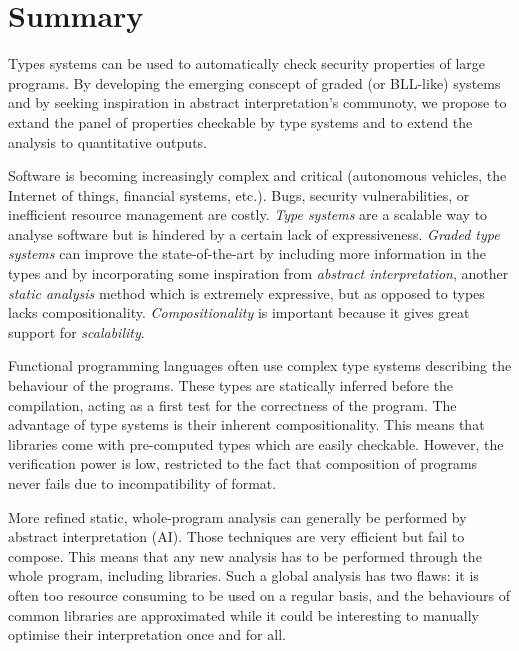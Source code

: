 \documentclass{article}[11pt]
\begin{document}
\vspace{2cm}



\newpage


\section{Summary}

Types systems can be used to automatically check security properties of large programs. By developing the emerging conscept of graded (or BLL-like) systems and by seeking inspiration in abstract interpretation's communoty, we propose to extand the panel of properties checkable by type systems and to extend the analysis to quantitative outputs.

Software is becoming increasingly complex and critical (autonomous vehicles, the Internet of things, financial systems, etc.). Bugs, security vulnerabilities, or inefficient resource management are costly. {\em Type systems} are a scalable way to analyse software but is hindered by a certain lack of expressiveness. {\em Graded type systems} can improve the state-of-the-art by including more information in the types and by incorporating some inspiration from {\em abstract interpretation}, another {\em static analysis} method which is extremely expressive, but as opposed to types lacks compositionality. {\em Compositionality} is important because it gives great support for {\em scalability}.

Functional programming languages often use complex type systems describing the behaviour of the programs. These types are statically inferred before the compilation, acting as a first test for the correctness of the program. The advantage of type systems is their inherent compositionality. This means that libraries come with pre-computed types which are easily checkable. However, the verification power is low, restricted to the fact that composition of programs never fails due to incompatibility of format.

More refined static, whole-program analysis can generally be performed by abstract interpretation (AI). Those techniques are very efficient but fail to compose. This means that any new analysis has to be performed through the whole program, including libraries. Such a global analysis has two flaws: it is often too resource consuming to be used on a regular basis, and the behaviours of common libraries are approximated while it could be interesting to manually optimise their interpretation once and for all.
\end{document}
